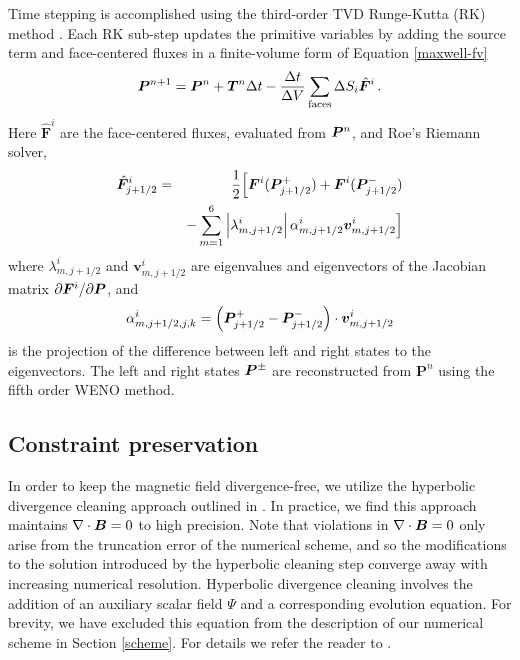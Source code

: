 Time stepping is accomplished using the third-order TVD Runge-Kutta (RK) method \citep{Gottlieb:1998:TVD:279724.279737}.
Each RK sub-step updates the primitive variables by adding the source term and face-centered fluxes in a finite-volume form of Equation \ref{maxwell-fv}
%
\begin{equation}
    \boldsymbol{P}^{n + 1} = \boldsymbol{P}^n + \boldsymbol{T}^n \Delta t - \frac{\Delta t}{\Delta V} \sum_{\rm{faces}} \Delta S_i \hat{\boldsymbol{F}}^i\, .
\end{equation}
%
Here $\hat{\boldsymbol{F}}^i$ are the face-centered fluxes, evaluated from $\boldsymbol{P}^{n}$, and Roe's Riemann solver,
%
\begin{eqnarray}
	\hat{\boldsymbol{F}}^i_{j+1/2} &=& \frac{1}{2}\Big[\boldsymbol{F}^i(\boldsymbol{P}^+_{j+1/2}) + \boldsymbol{F}^i(\boldsymbol{P}^-_{j+1/2}) \nonumber\\
    && -\sum\limits_{m=1}^6  \left|\lambda^i_{m, j+1/2}\right| \alpha^i_{m, j+1/2}\boldsymbol{v}^i_{m, j+1/2} \Big]
\end{eqnarray}
%
where  $\lambda^i_{m, j+1/2}$ and $\boldsymbol{v}^i_{m, j+1/2}$ are eigenvalues and eigenvectors of the Jacobian matrix $\partial \boldsymbol{F}^i / \partial \boldsymbol{P}$,
%
and
%
\begin{equation}
	\alpha^i_{m, j+1/2,j,k} = \left(\boldsymbol{P}^+_{j+1/2}-\boldsymbol{P}^-_{j+1/2}\right) \cdot \boldsymbol{v}^i_{m, j+1/2}
\end{equation}
%
is the projection of the difference between left and right states to the eigenvectors.
The left and right states $\boldsymbol{P}^{\pm}$ are reconstructed from $\boldsymbol{P}^n$ using the fifth order WENO method. 

\subsection{Constraint preservation}
\label{constraint}
%
In order to keep the magnetic field divergence-free, we utilize the hyperbolic divergence cleaning approach outlined in \citet{2002JCoPh.175..645D}. In practice, we find this approach maintains $\nabla \cdot \boldsymbol{B} = 0$ to high precision. Note that violations in $\nabla \cdot \boldsymbol{B} = 0$ only arise from the truncation error of the numerical scheme, and so the modifications to the solution introduced by the hyperbolic cleaning step converge away with increasing numerical resolution. Hyperbolic divergence cleaning involves the addition of an auxiliary scalar field $\Psi$ and a corresponding evolution equation. For brevity, we have excluded this equation from the description of our numerical scheme in Section \ref{scheme}. For details we refer the reader to \cite{2002JCoPh.175..645D}.

